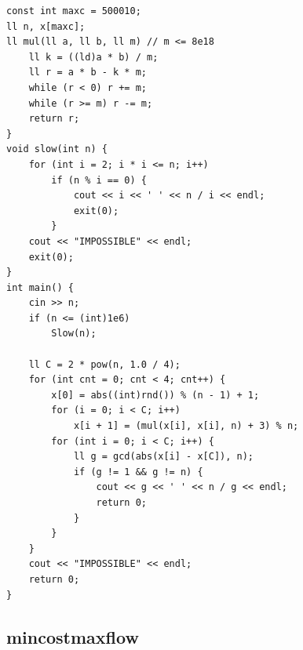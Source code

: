\documentclass[10pt, portrait,letterpaper]{article}
\begin{document}
\begin{verbatim}
const int maxc = 500010;
ll n, x[maxc];
ll mul(ll a, ll b, ll m) // m <= 8e18
    ll k = ((ld)a * b) / m;
    ll r = a * b - k * m;
    while (r < 0) r += m;
    while (r >= m) r -= m;
    return r;
}
void slow(int n) {
    for (int i = 2; i * i <= n; i++)
        if (n % i == 0) {
            cout << i << ' ' << n / i << endl;
            exit(0);
        }
    cout << "IMPOSSIBLE" << endl;
    exit(0);
}
int main() {
    cin >> n;
    if (n <= (int)1e6)
        Slow(n);

    ll C = 2 * pow(n, 1.0 / 4);
    for (int cnt = 0; cnt < 4; cnt++) {
        x[0] = abs((int)rnd()) % (n - 1) + 1;
        for (i = 0; i < C; i++)
            x[i + 1] = (mul(x[i], x[i], n) + 3) % n;
        for (int i = 0; i < C; i++) {
            ll g = gcd(abs(x[i] - x[C]), n);
            if (g != 1 && g != n) {
                cout << g << ' ' << n / g << endl;
                return 0;
            }
        }
    }
    cout << "IMPOSSIBLE" << endl;
    return 0;
}
\end{verbatim}


\subsection{mincostmaxflow}
\end{document}
